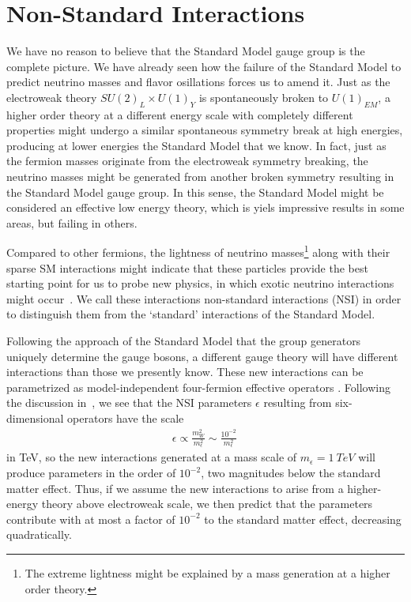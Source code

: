 % 


% 
\section{Non-Standard Interactions}\label{sec:nsiTheory}
We have no reason to believe that the Standard Model 
gauge group is the complete picture. We have already seen how the failure of the Standard Model to predict neutrino masses and flavor 
osillations forces us to amend it. 
Just as the electroweak theory $SU(2)_L \times U(1)_Y$ is 
spontaneously broken to $U(1)_{EM}$, a higher order theory at a different energy scale with completely different
properties might undergo a similar spontaneous symmetry break at high energies, 
producing at lower energies the Standard Model that we know. In fact, 
just as the fermion masses originate from the electroweak symmetry breaking, the neutrino masses might be generated from 
another broken symmetry resulting in the Standard Model gauge group.
In this sense, the Standard Model might be considered 
an effective low energy theory, which is yiels impressive results in some areas, but failing in others. 

Compared to other fermions, the lightness of neutrino masses\footnote{The extreme lightness might be explained 
by a mass generation at a higher order theory.} along with their sparse SM interactions might 
indicate that these particles provide the best starting point for us to probe new physics, in which 
exotic neutrino interactions might occur~\cite{gavela2009}. We call these interactions non-standard interactions (NSI) in order to 
distinguish them from the `standard' interactions of the Standard Model.
 
Following the approach of the Standard Model that the group generators uniquely determine the gauge bosons, a different gauge
theory will have different interactions than those we presently know. These new interactions can be parametrized as model-independent four-fermion effective operators \cite{salvadoNSI,nsiFarzan}.
Following the discussion in~\cite{tommyNSI}, we see that the NSI parameters $\epsilon$ resulting from six-dimensional operators have the scale
\begin{align}
    \epsilon \propto \frac{m_W^2}{m_{\epsilon}^2} \sim \frac{10^{-2}}{m_\epsilon^2}\,
\end{align} 
in TeV, so the new interactions generated at a mass scale of $m_\epsilon = \SI{1}{TeV}$ will produce parameters in the order of $10^{-2}$, 
two magnitudes below the standard matter effect. Thus, if we assume the new interactions to arise from a higher-energy theory above electroweak scale, 
we then predict that the parameters contribute with at most a factor of $10^{-2}$ to the standard matter effect, decreasing quadratically.


